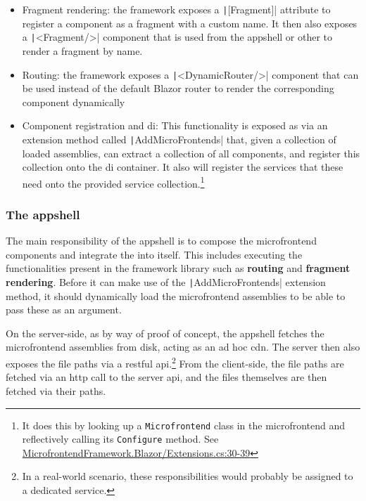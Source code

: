 \begin{itemize}
  \item Fragment rendering: the framework exposes a
  \texttt|[Fragment]| attribute to register a component as a
  fragment with a custom name. It then also exposes a
  \texttt|<Fragment/>| component that is used from the \gls{appshell}
  or other  to render a fragment by name.
  \item Routing: the framework exposes a \texttt|<DynamicRouter/>|
  component that can be used instead of the default Blazor router to render the
  corresponding component dynamically
  \item Component registration and \gls{di}: This functionality is exposed as
  via an extension method called \texttt|AddMicroFrontends| that,
  given a collection of loaded assemblies, can extract a collection of all
  components, and register this collection onto the \gls{di} container. It also
  will register the services that these  need onto the
  provided service collection.\footnote{It does this by looking up a
  \texttt{Microfrontend} class in the \gls{microfrontend} and reflectively
  calling its \texttt{Configure} method. See
  \href{https://github.com/DanteDeRuwe/bachelor-thesis-code/blob/main/src/framework/MicrofrontendFramework.Blazor/Extensions.cs\#L30-L39}{MicrofrontendFramework.Blazor/Extensions.cs:30-39}}
\end{itemize}

\subsubsection[The application shell]{The \gls{appshell}}

The main responsibility of the \gls{appshell} is to compose the
\gls{microfrontend} components and integrate the  into
itself. This includes executing the functionalities present in the framework
library such as \textbf{routing} and \textbf{fragment rendering}. Before it can
make use of the \texttt|AddMicroFrontends| extension method, it
should dynamically load the \gls{microfrontend} assemblies to be able to pass these as
an argument.

On the server-side, as by way of proof of concept, the \gls{appshell} fetches
the \gls{microfrontend} assemblies from disk, acting as an ad hoc \gls{cdn}. The
server then also exposes the file paths via a \gls{restful}
\gls{api}.\footnote{In a real-world scenario, these responsibilities would
probably be assigned to a dedicated service.} From the client-side, the file
paths are fetched via an \gls{http} call to the server \gls{api}, and the files
themselves are then fetched via their paths.

